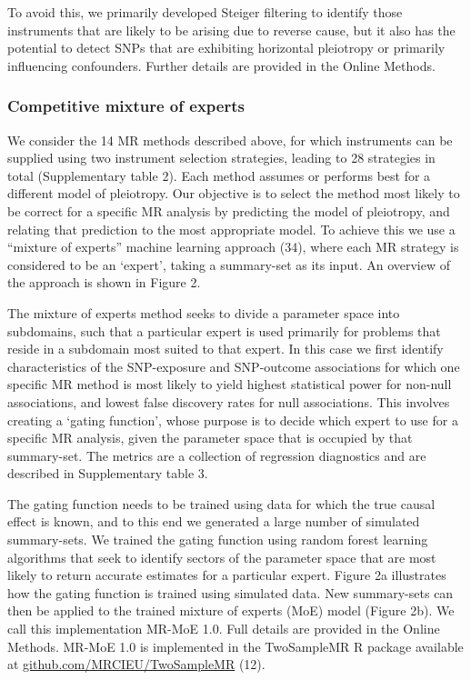 \documentclass[]{article}
\begin{document}
To avoid this, we primarily developed Steiger filtering to identify
those instruments that are likely to be arising due to reverse cause,
but it also has the potential to detect SNPs that are exhibiting
horizontal pleiotropy or primarily influencing confounders. Further
details are provided in the Online Methods.

\subsubsection{Competitive mixture of
experts}\label{competitive-mixture-of-experts}

We consider the 14 MR methods described above, for which instruments can
be supplied using two instrument selection strategies, leading to 28
strategies in total (Supplementary table 2). Each method assumes or
performs best for a different model of pleiotropy. Our objective is to
select the method most likely to be correct for a specific MR analysis
by predicting the model of pleiotropy, and relating that prediction to
the most appropriate model. To achieve this we use a ``mixture of
experts'' machine learning approach (34), where each MR strategy is
considered to be an `expert', taking a summary-set as its input. An
overview of the approach is shown in Figure 2.

The mixture of experts method seeks to divide a parameter space into
subdomains, such that a particular expert is used primarily for problems
that reside in a subdomain most suited to that expert. In this case we
first identify characteristics of the SNP-exposure and SNP-outcome
associations for which one specific MR method is most likely to yield
highest statistical power for non-null associations, and lowest false
discovery rates for null associations. This involves creating a `gating
function', whose purpose is to decide which expert to use for a specific
MR analysis, given the parameter space that is occupied by that
summary-set. The metrics are a collection of regression diagnostics and
are described in Supplementary table 3.

The gating function needs to be trained using data for which the true
causal effect is known, and to this end we generated a large number of
simulated summary-sets. We trained the gating function using random
forest learning algorithms that seek to identify sectors of the
parameter space that are most likely to return accurate estimates for a
particular expert. Figure 2a illustrates how the gating function is
trained using simulated data. New summary-sets can then be applied to
the trained mixture of experts (MoE) model (Figure 2b). We call this
implementation MR-MoE 1.0. Full details are provided in the Online
Methods. MR-MoE 1.0 is implemented in the TwoSampleMR R package
available at
\href{https://github.com/MRCIEU/TwoSampleMR}{github.com/MRCIEU/TwoSampleMR}
(12).
\end{document}
